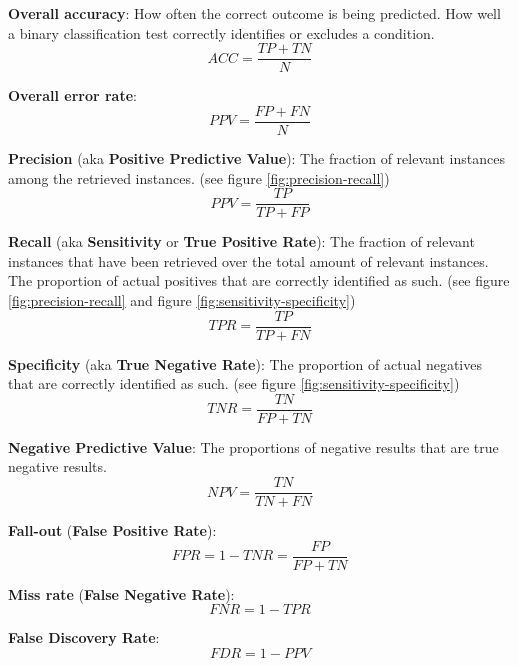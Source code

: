 \begin{myitem}
    \item \textbf{Overall accuracy}: How often the correct outcome is being predicted. How well a binary classification test correctly identifies or excludes a condition.
    \begin{equation}\label{eq:accuracy}
        ACC = \frac{TP+TN}{N}
    \end{equation}
    \item \textbf{Overall error rate}:
    \begin{equation}\label{eq:error-rate}
        PPV = \frac{FP+FN}{N}
    \end{equation}
    \item \textbf{Precision} (aka \textbf{Positive Predictive Value}): The fraction of relevant instances among the retrieved instances.
    (see figure \ref{fig:precision-recall})
    \begin{equation}\label{eq:precision}
        PPV = \frac{TP}{TP+FP}
    \end{equation}
    \item \textbf{Recall} (aka \textbf{Sensitivity} or \textbf{True Positive Rate}): The fraction of relevant instances that have been retrieved over the total amount of relevant instances. The proportion of actual positives that are correctly identified as such.
    (see figure \ref{fig:precision-recall} and figure \ref{fig:sensitivity-specificity})
    \begin{equation}\label{eq:recall}
        TPR = \frac{TP}{TP+FN}
    \end{equation}
    \item \textbf{Specificity} (aka \textbf{True Negative Rate}): The proportion of actual negatives that are correctly identified as such.
    (see figure \ref{fig:sensitivity-specificity})
    \begin{equation}\label{eq:specificity}
        TNR = \frac{TN}{FP+TN}
    \end{equation}
    \item \textbf{Negative Predictive Value}: The proportions of negative results that are true negative results.
    \begin{equation}\label{eq:npv}
        NPV = \frac{TN}{TN+FN}
    \end{equation}
    \item \textbf{Fall-out} (\textbf{False Positive Rate}):
    \begin{equation}\label{eq:fpr}
    FPR = 1-TNR = \frac{FP}{FP + TN}
    \end{equation}
    \item \textbf{Miss rate} (\textbf{False Negative Rate}):
    \begin{equation}\label{eq:fnr}
    FNR=1-TPR
    \end{equation}
    \item \textbf{False Discovery Rate}:
    \begin{equation}\label{eq:fdr}
        FDR=1-PPV
    \end{equation}
\end{myitem}

